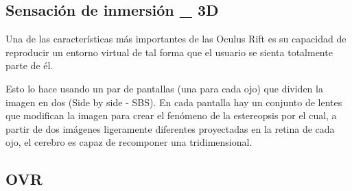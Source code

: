 \documentclass[twoside, 11pt]{epstfg}
\begin{document}
%
%
%
%
%
%
%
%
%
%
%

\subsection{Sensación de inmersión \_ 3D}

Una de las características más importantes de las Oculus Rift es su capacidad de reproducir un entorno virtual de tal forma que el usuario se sienta totalmente parte de él.

Esto lo hace usando un par de pantallas (una para cada ojo) que dividen la imagen en dos (Side by side - SBS). En cada pantalla hay un conjunto de lentes que modifican la imagen para crear el fenómeno de la estereopsis por el cual, a partir de dos imágenes ligeramente diferentes proyectadas en la retina de cada ojo, el cerebro es capaz de recomponer una tridimensional.

\subsection{OVR}\label{subsec::OVR}
\end{document}
